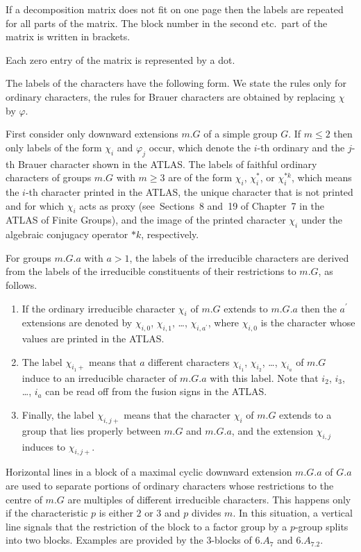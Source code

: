 \documentclass[a4paper]{article}
\def\ATLAS{{\sf ATLAS}}
\begin{document}
If a decomposition matrix does not fit on one page then the labels are
repeated for all parts of the matrix.
The block number in the second etc.~part of the matrix is written in
brackets.

Each zero entry of the matrix is represented by a dot.

The labels of the characters have the following form.
We state the rules only for ordinary characters,
the rules for Brauer characters are obtained by replacing $\chi$
by $\varphi$.

First consider only downward extensions $m.G$ of a simple group $G$.
If $m \leq 2$ then only labels of the form $\chi_i$ and $\varphi_j$
occur,
which denote the $i$-th ordinary and the $j$-th Brauer character shown in
the {\ATLAS}.
The labels of faithful ordinary characters of groups $m.G$ with $m\geq 3$
are of the form $\chi_i$, $\chi_i^{\ast}$, or $\chi_i^{\ast k}$,
which means the $i$-th character printed in the {\ATLAS},
the unique character that is not printed and for which $\chi_i$ acts as
proxy
(see~Sections~8 and~19 of Chapter~7 in the {\ATLAS} of Finite Groups),
and the image of the printed character $\chi_i$ under the algebraic
conjugacy operator $\ast k$, respectively.

For groups $m.G.a$ with $a > 1$, the labels of the irreducible characters
are derived from the labels of the irreducible constituents of their
restrictions to $m.G$, as follows.
\begin{enumerate}
\item
    If the ordinary irreducible character $\chi_i$ of $m.G$ extends to
    $m.G.a$ then the $a^{\prime}$ extensions are denoted by
    $\chi_{i,0}$, $\chi_{i,1}$, \ldots, $\chi_{i,a^{\prime}}$,
    where $\chi_{i,0}$ is the character whose values are printed in the
    {\ATLAS}.
\item
    The label $\chi_{i_1+}$ means that $a$ different characters
    $\chi_{i_1}$, $\chi_{i_2}$, \ldots, $\chi_{i_a}$ of $m.G$ induce to
    an irreducible character of $m.G.a$ with this label.
    Note that $i_2$, $i_3$, \ldots, $i_a$ can be read off from the
    fusion signs in the {\ATLAS}.
\item
    Finally, the label $\chi_{i,j+}$ means that the character $\chi_i$
    of $m.G$ extends to a group that lies properly between $m.G$ and
    $m.G.a$, and the extension $\chi_{i,j}$ induces to $\chi_{i,j+}$.
\end{enumerate}

Horizontal lines in a block of a maximal cyclic downward extension
$m.G.a$ of $G.a$ are used to separate portions of ordinary characters
whose restrictions to the centre of $m.G$ are multiples of different
irreducible characters.
This happens only if the characteristic $p$ is either $2$ or $3$ and
$p$ divides $m$.
In this situation, a vertical line signals that the restriction of the
block to a factor group by a $p$-group splits into two blocks.
Examples are provided by the $3$-blocks of $6.A_7$ and $6.A_7.2$.
\end{document}
